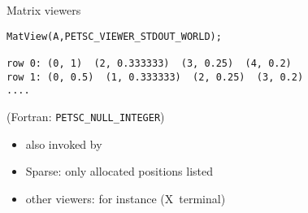\begin{details}
\begin{numberedframe}{Matrix viewers}
\begin{lstlisting}
MatView(A,PETSC_VIEWER_STDOUT_WORLD);

row 0: (0, 1)  (2, 0.333333)  (3, 0.25)  (4, 0.2)
row 1: (0, 0.5)  (1, 0.333333)  (2, 0.25)  (3, 0.2)
....
\end{lstlisting}
(Fortran: \lstinline{PETSC_NULL_INTEGER})
  \begin{itemize}
  \item also invoked by 
  \item Sparse: only allocated positions listed
  \item other viewers: for instance  (X~terminal)
  \end{itemize}

\end{numberedframe}

\end{details}


